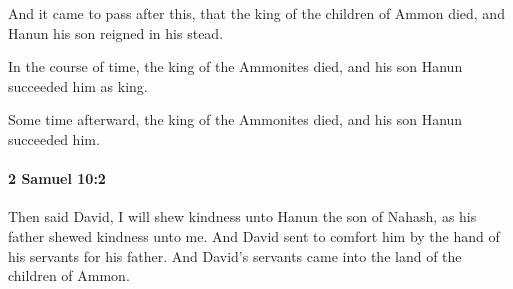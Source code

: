 			\begin{versebox}
					\item[BHS] 
					\item[ASV] And it came to pass after this, that the king of the children of Ammon died, and Hanun his son reigned in his stead.
					\item[NIV] In the course of time, the king of the Ammonites died, and his son Hanun succeeded him as king.
					\item[NRSV] Some time afterward, the king of the Ammonites died, and his son Hanun succeeded him.
			\end{versebox}

		\paragraph{2 Samuel 10:2} %
			\label{2SAMUEL-10-2}

			Then said David, I will shew kindness unto Hanun the son of Nahash, as his father shewed kindness unto me. And David sent to comfort him by the hand of his servants for his father. And David’s servants came into the land of the children of Ammon.

